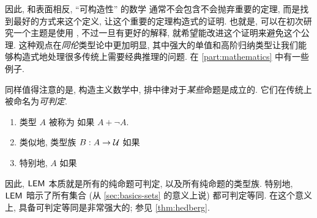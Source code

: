 因此, 和表面相反, ``可构造性'' 的数学 通常不会包含不会抛弃重要的定理, 而是找到最好的方式来这个定义, 让这个重要的定理构造式的证明.
也就是, 可以在初次研究一个主题是使用 \LEM{}, 不过一旦有更好的解释, 就希望能改进这个证明来避免这个公理.
这种观点在\emph{同伦}类型论中更加明显, 其中强大的单值和高阶归纳类型让我们能够构造式地处理很多传统上需要经典推理的问题.
在 \cref{part:mathematics} 中有一些例子.

同样值得注意的是, 构造主义数学中, 排中律对于\emph{某些}命题是成立的.
它们在传统上被命名为\emph{可判定}.

\begin{defn}
    \label{defn:decidable-equality}
    \mbox{}
    \begin{enumerate}
        \item 类型 $A$ 被称为 
        如果 $A+\neg A$.
        \item 类似地, 类型族 $B:A\to \mathcal{U}$ 
        如果  \label{item:decidable-equality2}
        \item 特别地, $A$ 
        如果 
    \end{enumerate}
\end{defn}

因此, $\mathsf{LEM}_{}$ 本质就是所有的纯命题可判定, 以及所有纯命题的类型族.
特别地, $\mathsf{LEM}_{}$ 暗示了所有集合 (从 \cref{sec:basics-sets} 的意义上说) 都可判定等同.
在这个意义上, 具备可判定等同是非常强大的; 参见 \cref{thm:hedberg}.

%
%
